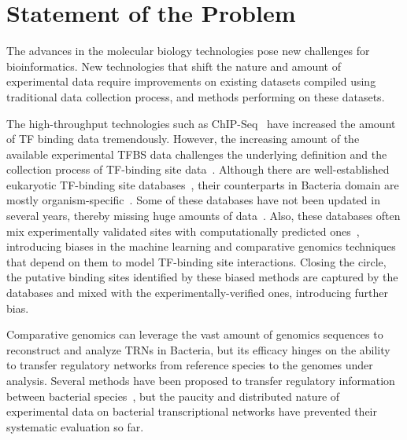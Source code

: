 \section{Statement of the Problem}

The advances in the molecular biology technologies pose new challenges for
bioinformatics. New technologies that shift the nature and amount of
experimental data require improvements on existing datasets compiled using
traditional data collection process, and methods performing on these datasets.

The high-throughput technologies such as ChIP-Seq~\cite{bailey2013practical}
have increased the amount of TF binding data tremendously. However, the
increasing amount of the available experimental TFBS data challenges the
underlying definition and the collection process of TF-binding site
data~\cite{salgado2013regulondb}. Although there are well-established
eukaryotic TF-binding site databases~\cite{mathelier2015jaspar,
  matys2003transfac}, their counterparts in Bacteria domain are mostly
organism-specific~\cite{salgado2013regulondb, sierro2008dbtbs,
  jacques2005mtbreglist, pauling2012coryneregnet}. Some of these databases have
not been updated in several years, thereby missing huge amounts of
data~\cite{munch2003prodoric}. Also, these databases often mix experimentally
validated sites with computationally predicted
ones~\cite{kazakov2007regtransbase}, introducing biases in the machine learning
and comparative genomics techniques that depend on them to model TF-binding
site interactions. Closing the circle, the putative binding sites identified by
these biased methods are captured by the databases and mixed with the
experimentally-verified ones, introducing further bias.

Comparative genomics can leverage the vast amount of genomics sequences to
reconstruct and analyze TRNs in Bacteria, but its efficacy hinges on the
ability to transfer regulatory networks from reference species to the genomes
under analysis. Several methods have been proposed to transfer regulatory
information between bacterial species~\cite{babu2009methods,
  baumbach2010power}, but the paucity and distributed nature of experimental
data on bacterial transcriptional networks have prevented their systematic
evaluation so far.


